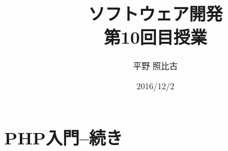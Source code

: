 
\title{ソフトウェア開発\\第10回目授業}
\author{平野 照比古}
\institute{}
\date{2016/12/2}
\newtheorem{Prob}{解説}
\newcommand{\Elm}[1]{\texttt{<#1>}}

\newcommand{\DOMM}{\texttt}
\newcommand{\Event}{\texttt}
\newcommand{\DOMP}{\texttt}
\newcommand{\DOM}{\texttt{DOM}}
\newcommand{\keyitem}{\relax}
\newcommand{\HTML}{HTML文書}

\frame{\maketitle}
\section{PHP入門--続き}
 
